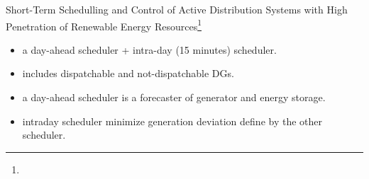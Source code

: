 \documentclass[10pt]{beamer}
\begin{document}
\begin{frame}{Short-Term Schedulling and Control of Active Distribution Systems with High Penetration of Renewable Energy Resources\footnote{} }
\begin{itemize}
\item a day-ahead scheduler + intra-day (15 minutes) scheduler.
\item includes dispatchable and not-dispatchable DGs.
\item a day-ahead scheduler is a forecaster of generator and energy storage.
\item intraday scheduler minimize generation deviation define by the other scheduler.
\end{itemize}
\end{frame}


%
%
\end{document}
